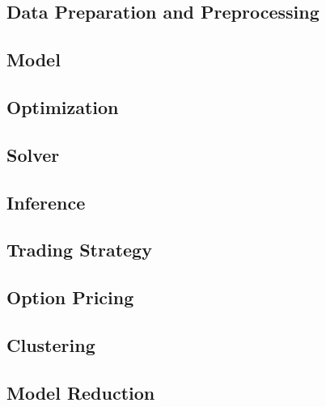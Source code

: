 \documentclass[12pt,a4paper]{article}
\begin{document}
\subsection{Data Preparation and Preprocessing}


\subsection{Model}


\subsection{Optimization}


\subsection{Solver}

\subsection{Inference}


\subsection{Trading Strategy}


\subsection{Option Pricing}


\subsection{Clustering}


\subsection{Model Reduction}



\end{document}
